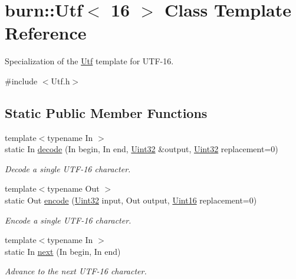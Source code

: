 \hypertarget{classburn_1_1_utf_3_0116_01_4}{\section{burn\-:\-:Utf$<$ 16 $>$ Class Template Reference}
\label{classburn_1_1_utf_3_0116_01_4}
}


Specialization of the \hyperlink{classburn_1_1_utf}{Utf} template for U\-T\-F-\/16.  




{\ttfamily \#include $<$Utf.\-h$>$}

\subsection*{Static Public Member Functions}
\begin{DoxyCompactItemize}
\item 
{\footnotesize template$<$typename In $>$ }\\static In \hyperlink{classburn_1_1_utf_3_0116_01_4_ae65212c8accf756f7781b4107726b9de}{decode} (In begin, In end, \hyperlink{namespaceburn_ab40b09022209bd449d317c1f0e95356b}{Uint32} \&output, \hyperlink{namespaceburn_ab40b09022209bd449d317c1f0e95356b}{Uint32} replacement=0)
\begin{DoxyCompactList}\small\item\em Decode a single U\-T\-F-\/16 character. \end{DoxyCompactList}\item 
{\footnotesize template$<$typename Out $>$ }\\static Out \hyperlink{classburn_1_1_utf_3_0116_01_4_a6a357bf79d89f2c95cb435d6645b3809}{encode} (\hyperlink{namespaceburn_ab40b09022209bd449d317c1f0e95356b}{Uint32} input, Out output, \hyperlink{namespaceburn_ae0d8cb20051239cfa3dc71407cdef5e4}{Uint16} replacement=0)
\begin{DoxyCompactList}\small\item\em Encode a single U\-T\-F-\/16 character. \end{DoxyCompactList}\item 
{\footnotesize template$<$typename In $>$ }\\static In \hyperlink{classburn_1_1_utf_3_0116_01_4_a22710fb3808c048b866a2157d81b3a26}{next} (In begin, In end)
\begin{DoxyCompactList}\small\item\em Advance to the next U\-T\-F-\/16 character. \end{DoxyCompactList}\item 

\end{DoxyCompactItemize}
